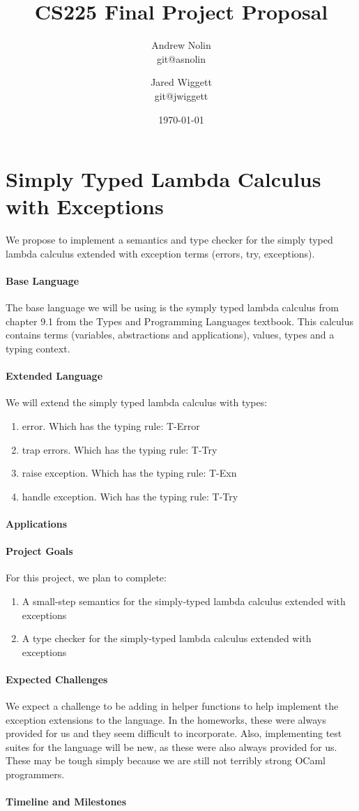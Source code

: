 \documentclass{article}
\title{CS225 Final Project Proposal}
\author{Andrew Nolin \\ git@asnolin \and Jared Wiggett \\ git@jwiggett}
\date{\today}
\begin{document}
\maketitle
\section*{Simply Typed Lambda Calculus with Exceptions}
We propose to implement a semantics and type checker for the simply typed lambda calculus extended with exception terms (errors, try, exceptions). 


\paragraph{Base Language}
The base language we will be using is the symply typed lambda calculus from chapter 9.1 from the Types and Programming Languages textbook. This calculus contains terms (variables, abstractions and  applications), values, types and a typing context.
\paragraph{Extended Language}
We will extend the simply typed lambda calculus with types: 
\begin{enumerate}
	\item error. Which has the typing rule: T-Error
	\item trap errors. Which has the typing rule: T-Try
	\item raise exception. Which has the typing rule: T-Exn
	\item handle exception. Wich has the typing rule: T-Try
\end{enumerate}
\paragraph{Applications}

\paragraph{Project Goals}
For this project, we plan to complete:
\begin{enumerate}
\item A small-step semantics for the simply-typed lambda calculus extended with exceptions
\item A type checker for the simply-typed lambda calculus extended with exceptions
	\end{enumerate}
\paragraph{Expected Challenges}
We expect a challenge to be adding in helper functions to help implement the exception extensions to the language. In the homeworks, these were always provided for us and they seem difficult to incorporate. Also, implementing test suites for the language will be new, as these were also always provided for us. These may be tough simply because we are still not terribly strong OCaml programmers.

\paragraph{Timeline and Milestones}
\end{document}

